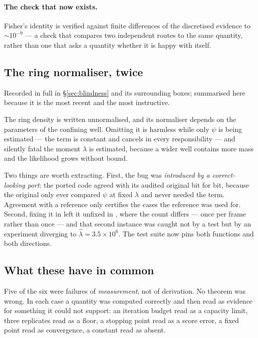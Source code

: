 \paragraph{The check that now exists.} Fisher's identity is verified against finite differences
of the discretised evidence to ${\sim}10^{-9}$ --- a check that compares two independent routes to
the same quantity, rather than one that asks a quantity whether it is happy with itself.

\subsection{The ring normaliser, twice}
\label{sec:corr-ring}

Recorded in full in \S\ref{sec:blindness} and its surrounding boxes; summarised here because it
is the most recent and the most instructive.

The ring density is written unnormalised, and its normaliser depends on the parameters of the
confining well. Omitting it is harmless while only $\psi$ is being estimated --- the term is
constant and cancels in every responsibility --- and silently fatal the moment $\lambda$ is
estimated, because a wider well contains more mass and the likelihood grows without bound.

Two things are worth extracting. First, the bug was \emph{introduced by a correct-looking
port}: the ported code agreed with its audited original bit for bit, because the original only
ever compared $\psi$ at fixed $\lambda$ and never needed the term. Agreement with a reference
only certifies the cases the reference was used for. Second, fixing it in
 left it unfixed in
, where the count differs --- once per frame rather than
once --- and that second instance was caught not by a test but by an experiment diverging to
$\hat\lambda = 3.5\times10^{6}$. The test suite now pins both functions and both directions.

\subsection{What these have in common}

Five of the six were failures of \emph{measurement}, not of derivation. No theorem was wrong. In
each case a quantity was computed correctly and then read as evidence for something it could not
support: an iteration budget read as a capacity limit, three replicates read as a floor, a
stopping point read as a score error, a fixed point read as convergence, a constant read as
absent.

